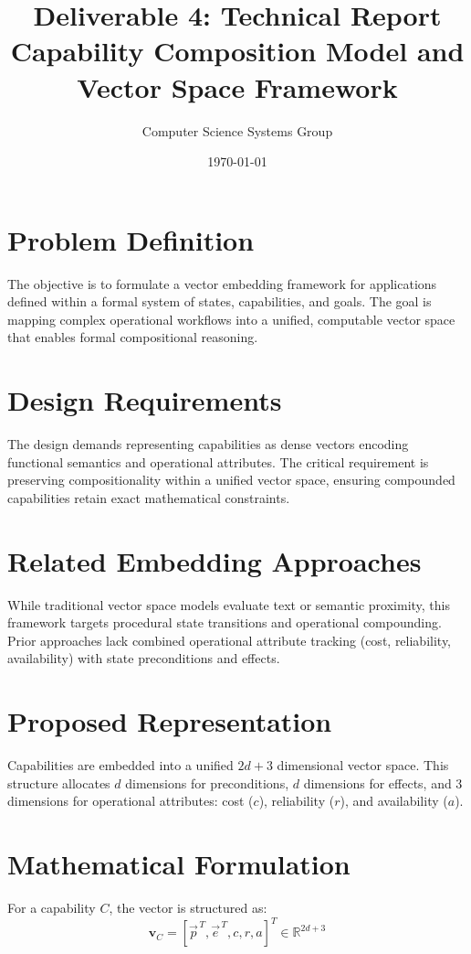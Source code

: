 \documentclass[11pt,a4paper]{article}
\title{Deliverable 4: Technical Report\\Capability Composition Model and Vector Space Framework}
\author{Computer Science Systems Group}
\date{\today}
\begin{document}
\maketitle

\section{Problem Definition}
The objective is to formulate a vector embedding framework for applications defined within a formal system of states, capabilities, and goals. The goal is mapping complex operational workflows into a unified, computable vector space that enables formal compositional reasoning.

\section{Design Requirements}
The design demands representing capabilities as dense vectors encoding functional semantics and operational attributes. The critical requirement is preserving compositionality within a unified vector space, ensuring compounded capabilities retain exact mathematical constraints.

\section{Related Embedding Approaches}
While traditional vector space models evaluate text or semantic proximity, this framework targets procedural state transitions and operational compounding. Prior approaches lack combined operational attribute tracking (cost, reliability, availability) with state preconditions and effects.

\section{Proposed Representation}
Capabilities are embedded into a unified $2d+3$ dimensional vector space. This structure allocates $d$ dimensions for preconditions, $d$ dimensions for effects, and 3 dimensions for operational attributes: cost ($c$), reliability ($r$), and availability ($a$).

\section{Mathematical Formulation}
For a capability $C$, the vector is structured as:
\begin{equation}
\mathbf{v}_C = [\vec{p}^{\,T}, \vec{e}^{\,T}, c, r, a]^T \in \mathbb{R}^{2d+3}
\end{equation}
\end{document}
